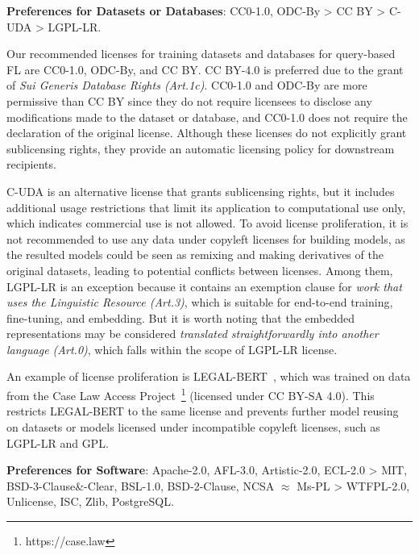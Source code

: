 \textbf{Preferences for Datasets or Databases}: CC0-1.0, ODC-By > CC BY > C-UDA > LGPL-LR.
   
  Our recommended licenses for training datasets and databases for query-based FL are CC0-1.0, ODC-By, and CC BY. CC BY-4.0 is preferred due to the grant of \textit{Sui Generis Database Rights (Art.1c)}. 
  CC0-1.0 and ODC-By are more permissive than CC BY since they do not require licensees to disclose any modifications made to the dataset or database, and CC0-1.0 does not require the declaration of the original license. 
  Although these licenses do not explicitly grant sublicensing rights, they provide an automatic licensing policy for downstream recipients.
  
  C-UDA is an alternative license that grants sublicensing rights, but it includes additional usage restrictions that limit its application to computational use only, which indicates commercial use is not allowed.
  To avoid license proliferation, it is not recommended to use any data under copyleft licenses for building models, as the resulted models could be seen as remixing and making derivatives of the original datasets, leading to potential conflicts between licenses.
  Among them, LGPL-LR is an exception because it contains an exemption clause for \textit{work that uses the Linguistic Resource (Art.3)}, which is suitable for end-to-end training, fine-tuning, and embedding. 
  But it is worth noting that the embedded representations may be considered \textit{translated straightforwardly into another language (Art.0)}, which falls within the scope of LGPL-LR license.
  
  An example of license proliferation is LEGAL-BERT~\cite{chalkidis2020legal}, which was trained on data from the Case Law Access Project~\footnote{https://case.law} (licensed under CC BY-SA 4.0). This restricts LEGAL-BERT to the same license and prevents further model reusing on datasets or models licensed under incompatible copyleft licenses, such as LGPL-LR and GPL.

  \textbf{Preferences for Software}: Apache-2.0, AFL-3.0, Artistic-2.0, ECL-2.0 > MIT, BSD-3-Clause\&-Clear, BSL-1.0, BSD-2-Clause, NCSA $\approx$ Ms-PL > WTFPL-2.0, Unlicense, ISC, Zlib, PostgreSQL.
  
